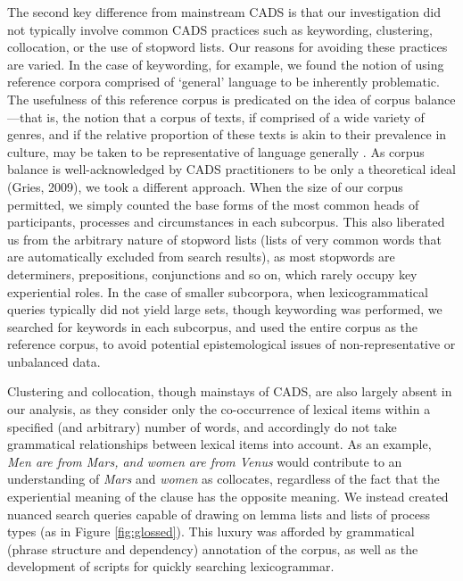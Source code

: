 		The second key difference from mainstream CADS is that our investigation did not typically involve common CADS practices such as keywording, clustering, collocation, or the use of stopword lists. Our reasons for avoiding these practices are varied. In the case of keywording, for example, we found the notion of using reference corpora comprised of `general' language to be inherently problematic. The usefulness of this reference corpus is predicated on the idea of corpus balance---that is, the notion that a corpus of texts, if comprised of a wide variety of genres, and if the relative proportion of these texts is akin to their prevalence in culture, may be taken to be representative of language generally \cite{chen_sinica_1996}. As corpus balance is well-acknowledged by CADS practitioners to be only a theoretical ideal (Gries, 2009), we took a different approach. When the size of our corpus permitted, we simply counted the base forms of the most common heads of participants, processes and circumstances in each subcorpus. This also liberated us from the arbitrary nature of stopword lists (lists of very common words that are automatically excluded from search results), as most stopwords are determiners, prepositions, conjunctions and so on, which rarely occupy key experiential roles. In the case of smaller subcorpora, when lexicogrammatical queries typically did not yield large sets, though keywording was performed, we searched for keywords in each subcorpus, and used the entire corpus as the reference corpus, to avoid potential epistemological issues of non-representative or unbalanced data.

		Clustering and collocation, though mainstays of CADS, are also largely absent in our analysis, as they consider only the co-occurrence of lexical items within a specified (and arbitrary) number of words, and accordingly do not take grammatical relationships between lexical items into account. As an example, \emph{Men are from Mars, and women are from Venus} would contribute to an understanding of \emph{Mars} and \emph{women} as collocates, regardless of the fact that the experiential meaning of the clause has the opposite meaning. We instead created nuanced search queries capable of drawing on lemma lists and lists of process types (as in Figure \ref{fig:glossed}). This luxury was afforded by grammatical (phrase structure and dependency) annotation of the corpus, as well as the development of scripts for quickly searching lexicogrammar.


